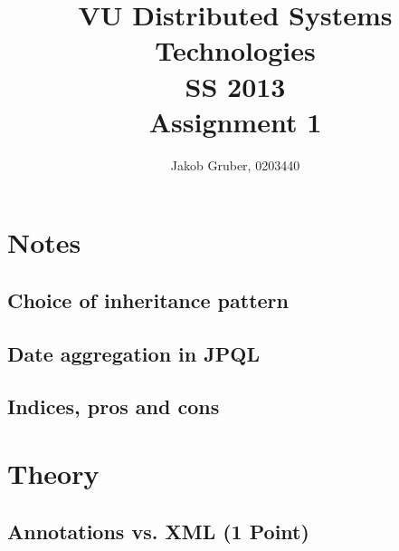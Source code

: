 \documentclass[a4paper,10pt]{article}
\title{VU Distributed Systems Technologies \\
       SS 2013 \\
       Assignment 1}
\author{Jakob Gruber, 0203440}
\begin{document}
\maketitle

\section{Notes}

\subsection{Choice of inheritance pattern}

\begin{comment}
InheritanceType: JOINED; Common table for base type, additional infos stored 
separately. SINGLE_TABLE sounds nice for our needs, but support is optional.

MappedSuperclass: the superclass contains persisted information, but is not
mapped as an entity by the JPA provider. State & mapping information common to
multiple entity classes. Non-entity superclasses don't support persistence,
and abstract entities are mapped (which we don't need).
\end{comment}

\subsection{Date aggregation in JPQL}

\begin{comment}
JPQL does not support date aggregation in any reasonable form, which means we
can't do summation within the query. Extract all rows individually, then
create the sum within java code.
\end{comment}

\subsection{Indices, pros and cons}

\begin{comment}
When is the User.password index helpful, when could it be harmful. Optional:
large-scale tests.
\end{comment}

\section{Theory}

\subsection{Annotations vs. XML (1 Point)}
\end{document}
